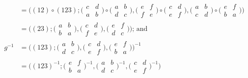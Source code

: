 \begin{example}
\begin{align*}
   				&= \bigl((12) \circ (123) ; \bigl(\begin{smallmatrix} c & d \\ a & b \end{smallmatrix}\bigr) \circ \bigl(\begin{smallmatrix} a & b \\ d & c \end{smallmatrix}\bigr), \bigl(\begin{smallmatrix} e & f \\ f & e \end{smallmatrix}\bigr) \circ \bigl(\begin{smallmatrix} c & d \\ e & f \end{smallmatrix}\bigr), \bigl(\begin{smallmatrix} a & b \\ c & d \end{smallmatrix}\bigr) \circ \bigl(\begin{smallmatrix} e & f \\ b & a \end{smallmatrix}\bigr)\bigr)\\
   				&= \bigl((23) ; \bigl(\begin{smallmatrix} a & b \\ b & a \end{smallmatrix}\bigr), \bigl(\begin{smallmatrix} c & d \\ f & e \end{smallmatrix}\bigr), \bigl(\begin{smallmatrix} e & f \\ d & c \end{smallmatrix}\bigr)\bigr) \text{; and} \\
   			g^{-1} &= \bigl((123) ; \bigl(\begin{smallmatrix} a & b \\ d & c \end{smallmatrix}\bigr), \bigl(\begin{smallmatrix} c & d \\ e & f \end{smallmatrix}\bigr), \bigl(\begin{smallmatrix} e & f \\ b & a \end{smallmatrix}\bigr)\bigr)^{-1} \\
   				   &= \bigl((123)^{-1} ; \bigl(\begin{smallmatrix} e & f \\ b & a \end{smallmatrix}\bigr)^{-1}, \bigl(\begin{smallmatrix} a & b \\ d & c \end{smallmatrix}\bigr)^{-1}, \bigl(\begin{smallmatrix} c & d \\ e & f \end{smallmatrix}\bigr)^{-1}\bigr)\\

\end{align*}
\end{example}

